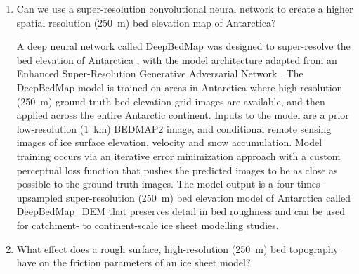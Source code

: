 \begin{enumerate}
  \item Can we use a super-resolution convolutional neural network to create a higher spatial resolution (\SI{250}{\metre}) bed elevation map of Antarctica?

  A deep neural network called DeepBedMap was designed to super-resolve the bed elevation of Antarctica \citep{LeongDeepBedMapdeepneural2020}, with the model architecture adapted from an Enhanced Super-Resolution Generative Adversarial Network \citep{WangESRGANEnhancedSuperResolution2019}.
  The DeepBedMap model is trained on areas in Antarctica where high-resolution (\SI{250}{\metre}) ground-truth bed elevation grid images are available, and then applied across the entire Antarctic continent.
  Inputs to the model are a prior low-resolution (\SI{1}{\kilo\metre}) BEDMAP2 image, and conditional remote sensing images of ice surface elevation, velocity and snow accumulation.
  Model training occurs via an iterative error minimization approach with a custom perceptual loss function that pushes the predicted images to be as close as possible to the ground-truth images.
  The model output is a four-times-upsampled super-resolution (\SI{250}{\metre}) bed elevation model of Antarctica called DeepBedMap\_DEM that preserves detail in bed roughness and can be used for catchment- to continent-scale ice sheet modelling studies.

  \item What effect does a rough surface, high-resolution (\SI{250}{\metre}) bed topography have on the friction parameters of an ice sheet model?


\end{enumerate}
